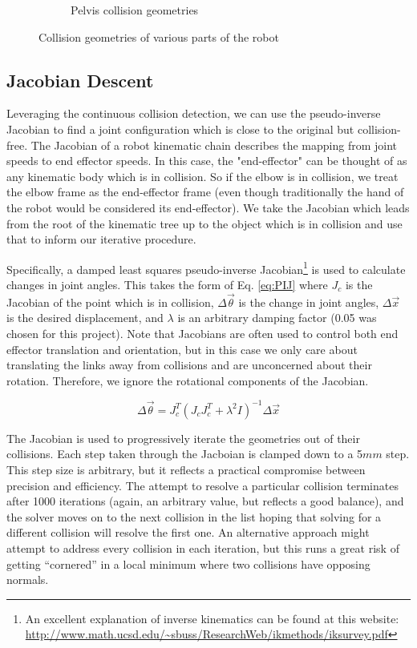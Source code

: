\documentclass[letterpaper, 10 pt, conference]{ieeeconf}  %
\begin{document}
\begin{figure}[h]
\begin{subfigure}[h]{0.45\columnwidth}
        \caption{Pelvis collision geometries}
        \label{fig:pelvis_col_geom}
    \end{subfigure}
    \caption{Collision geometries of various parts of the robot}
    \label{fig:col_geoms}
\end{figure}

\subsection{Jacobian Descent}

Leveraging the continuous collision detection, we can use the pseudo-inverse Jacobian to find a joint configuration which is close to the original but collision-free. The Jacobian of a robot kinematic chain describes the mapping from joint speeds to end effector speeds. In this case, the "end-effector" can be thought of as any kinematic body which is in collision. So if the elbow is in collision, we treat the elbow frame as the end-effector frame (even though traditionally the hand of the robot would be considered its end-effector). We take the Jacobian which leads from the root of the kinematic tree up to the object which is in collision and use that to inform our iterative procedure.

Specifically, a damped least squares pseudo-inverse Jacobian\footnote{An excellent explanation of inverse kinematics can be found at this website: \url{http://www.math.ucsd.edu/~sbuss/ResearchWeb/ikmethods/iksurvey.pdf}} is used to calculate changes in joint angles. This takes the form of Eq. \ref{eq:PIJ} where $J_{c}$ is the Jacobian of the point which is in collision, $\Delta \vec{\theta}$ is the change in joint angles, $\Delta \vec{x}$ is the desired displacement, and $\lambda$ is an arbitrary damping factor (0.05 was chosen for this project). Note that Jacobians are often used to control both end effector translation and orientation, but in this case we only care about translating the links away from collisions and are unconcerned about their rotation. Therefore, we ignore the rotational components of the Jacobian.

\begin{equation}
    \Delta \vec{\theta} = J_{c}^{T} ( J_{c} J_{c}^{T} + \lambda^{2} I )^{-1} \Delta \vec{x} 
    \label{eq:PIJ}
\end{equation}

The Jacobian is used to progressively iterate the geometries out of their collisions. Each step taken through the Jacboian is clamped down to a 5$mm$ step. This step size is arbitrary, but it reflects a practical compromise between precision and efficiency. The attempt to resolve a particular collision terminates after 1000 iterations (again, an arbitrary value, but reflects a good balance), and the solver moves on to the next collision in the list hoping that solving for a different collision will resolve the first one. An alternative approach might attempt to address every collision in each iteration, but this runs a great risk of getting ``cornered'' in a local minimum where two collisions have opposing normals.
\end{document}
